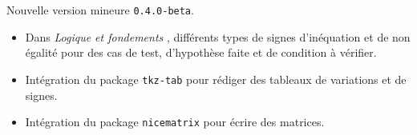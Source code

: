 Nouvelle version mineure \verb+0.4.0-beta+.

\begin{itemize}[itemsep=.5em]
    \item Dans \emph{\og Logique et fondements \fg}, différents types de signes d'inéquation et de non égalité pour des cas de test, d'hypothèse faite et de condition à vérifier.


    \item Intégration du package \verb+tkz-tab+ pour rédiger des tableaux de variations et de signes.


    \item Intégration du package \verb+nicematrix+ pour écrire des matrices.
\end{itemize}
